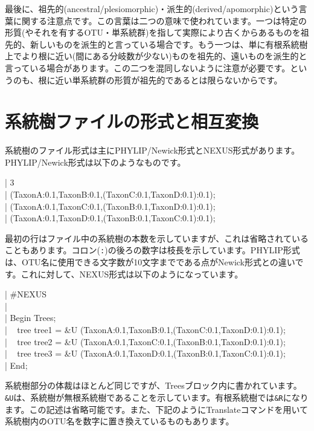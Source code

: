 \documentclass[titlepage,10pt,a4paper]{jsbook}
\newenvironment{content}{\begin{shaded}\vspace{-1em}\raggedright\ttfamily\footnotesize\setlength{\baselineskip}{1.4em}}{\end{shaded}\vspace{-1em}}
\begin{document}
最後に、祖先的(ancestral/plesiomorphic)・派生的(derived/apomorphic)という言葉に関する注意点です。この言葉は二つの意味で使われています。一つは特定の形質(やそれを有するOTU・単系統群)を指して実際により古くからあるものを祖先的、新しいものを派生的と言っている場合です。もう一つは、単に有根系統樹上でより根に近い(間にある分岐数が少ない)ものを祖先的、遠いものを派生的と言っている場合があります。この二つを混同しないように注意が必要です。というのも、根に近い単系統群の形質が祖先的であるとは限らないからです。

\section{系統樹ファイルの形式と相互変換}

系統樹のファイル形式は主にPHYLIP/Newick形式とNEXUS形式があります。PHYLIP/Newick形式は以下のようなものです。
\begin{content}
| 3\\
| (TaxonA:0.1,TaxonB:0.1,(TaxonC:0.1,TaxonD:0.1):0.1);\\
| (TaxonA:0.1,TaxonC:0.1,(TaxonB:0.1,TaxonD:0.1):0.1);\\
| (TaxonA:0.1,TaxonD:0.1,(TaxonB:0.1,TaxonC:0.1):0.1);
\end{content}
最初の行はファイル中の系統樹の本数を示していますが、これは省略されていることもあります。コロン(\texttt{:})の後ろの数字は枝長を示しています。PHYLIP形式は、OTU名に使用できる文字数が10文字までである点がNewick形式との違いです。これに対して、NEXUS形式は以下のようになっています。
\begin{content}
| \#NEXUS\\
| ~\\
| Begin Trees;\\
| ~ tree tree{\textunderscore}1 = {\lbrack}\&U{\rbrack} (TaxonA:0.1,TaxonB:0.1,(TaxonC:0.1,TaxonD:0.1):0.1);\\
| ~ tree tree{\textunderscore}2 = {\lbrack}\&U{\rbrack} (TaxonA:0.1,TaxonC:0.1,(TaxonB:0.1,TaxonD:0.1):0.1);\\
| ~ tree tree{\textunderscore}3 = {\lbrack}\&U{\rbrack} (TaxonA:0.1,TaxonD:0.1,(TaxonB:0.1,TaxonC:0.1):0.1);\\
| End;
\end{content}
系統樹部分の体裁はほとんど同じですが、Treesブロック内に書かれています。\texttt{{\lbrack}\&U{\rbrack}}は、系統樹が無根系統樹であることを示しています。有根系統樹では\texttt{{\lbrack}\&R{\rbrack}}になります。この記述は省略可能です。また、下記のようにTranslateコマンドを用いて系統樹内のOTU名を数字に置き換えているものもあります。
\end{document}
